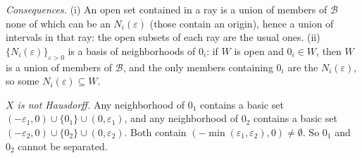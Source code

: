 \documentclass[11pt]{report}
\newcommand{\leeref}[1]{\par\smallskip{\raggedleft\footnotesize\textsc{Lee}:\ #1\par}}
\begin{document}
\begin{exbox}
\emph{Consequences.} (i) An open set contained in a ray is a union of members of $\mathcal{B}$ none of which can be an $N_i(\varepsilon)$ (those contain an origin), hence a union of intervals in that ray: the open subsets of each ray are the usual ones. (ii) $\{N_i(\varepsilon)\}_{\varepsilon > 0}$ is a basis of neighborhoods of $0_i$: if $W$ is open and $0_i \in W$, then $W$ is a union of members of $\mathcal{B}$, and the only members containing $0_i$ are the $N_i(\varepsilon)$, so some $N_i(\varepsilon) \subseteq W$.

\textit{$X$ is not Hausdorff.} Any neighborhood of $0_1$ contains a basic set $(-\varepsilon_1, 0) \cup \{0_1\} \cup (0, \varepsilon_1)$, and any neighborhood of $0_2$ contains a basic set $(-\varepsilon_2, 0) \cup \{0_2\} \cup (0, \varepsilon_2)$. Both contain $(-\min(\varepsilon_1, \varepsilon_2), 0) \neq \emptyset$. So $0_1$ and $0_2$ cannot be separated.
\leeref{Problem 1-1}
\end{exbox}
\end{document}
